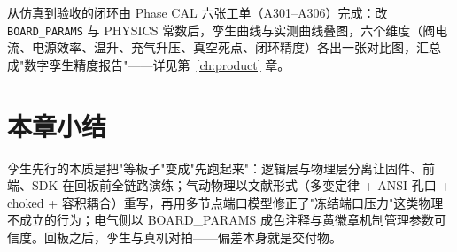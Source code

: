 从仿真到验收的闭环由 Phase CAL 六张工单（A301--A306）完成：改 \texttt{BOARD\_PARAMS} 与 PHYSICS 常数后，孪生曲线与实测曲线叠图，六个维度（阀电流、电源效率、温升、充气升压、真空死点、闭环精度）各出一张对比图，汇总成"数字孪生精度报告"——详见第~\ref{ch:product} 章。

\section*{本章小结}
孪生先行的本质是把"等板子"变成"先跑起来"：逻辑层与物理层分离让固件、前端、SDK 在回板前全链路演练；气动物理以文献形式（多变定律 + ANSI 孔口 + choked + 容积耦合）重写，再用多节点端口模型修正了"冻结端口压力"这类物理不成立的行为；电气侧以 BOARD\_PARAMS 成色注释与黄徽章机制管理参数可信度。回板之后，孪生与真机对拍——偏差本身就是交付物。
